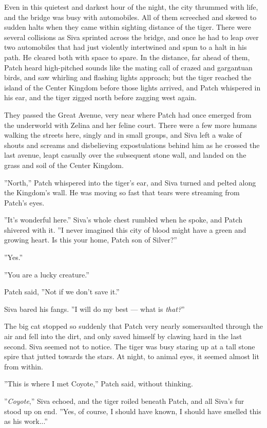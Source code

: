 \documentclass[12pt]{book}
\begin{document}
Even in this quietest and darkest hour of the night, the city thrummed with life, and the bridge was busy with automobiles. All of them screeched and skewed to sudden halts when they came within sighting distance of the tiger. There were several collisions as Siva sprinted across the bridge, and once he had to leap over two automobiles that had just violently intertwined and spun to a halt in his path. He cleared both with space to spare. In the distance, far ahead of them, Patch heard high-pitched sounds like the mating call of crazed and gargantuan birds, and saw whirling and flashing lights approach; but the tiger reached the island of the Center Kingdom before those lights arrived, and Patch whispered in his ear, and the tiger zigged north before zagging west again.

They passed the Great Avenue, very near where Patch had once emerged from the underworld with Zelina and her feline court. There were a few more humans walking the streets here, singly and in small groups, and Siva left a wake of shouts and screams and disbelieving expostulations behind him as he crossed the last avenue, leapt casually over the subsequent stone wall, and landed on the grass and soil of the Center Kingdom.

''North,'' Patch whispered into the tiger's ear, and Siva turned and pelted along the Kingdom's wall. He was moving so fast that tears were streaming from Patch's eyes.

''It's wonderful here.'' Siva's whole chest rumbled when he spoke, and Patch shivered with it. ''I never imagined this city of blood might have a green and growing heart. Is this your home, Patch son of Silver?''

''Yes.''

''You are a lucky creature.''

Patch said, ''Not if we don't save it.''

Siva bared his fangs. ''I will do my best ---
what is {\it that?}''

The big cat stopped so suddenly that Patch very nearly somersaulted through the air and fell into the dirt, and only saved himself by clawing hard in the last second. Siva seemed not to notice. The tiger was busy staring up at a tall stone spire that jutted towards the stars. At night, to animal eyes, it seemed almost lit from within.

''This is where I met Coyote,'' Patch said, without thinking.

''{\it Coyote},'' Siva echoed, and the tiger roiled beneath Patch, and all Siva's fur stood up on end. ''Yes, of course, I should have known, I should have smelled this as his work...''
\end{document}
